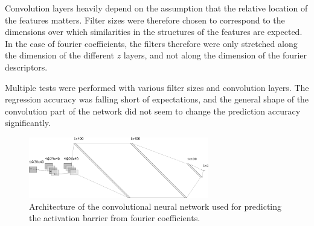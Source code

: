 Convolution layers heavily depend on the assumption that the relative location of the features matters.
Filter sizes were therefore chosen to correspond to the dimensions over which similarities in the structures of the features are expected.
In the case of fourier coefficients, the filters therefore were only stretched along the dimension of the different $z$ layers, and not along the dimension of the fourier descriptors.

Multiple tests were performed with various filter sizes and convolution layers.
The regression accuracy was falling short of expectations, and the general shape of the convolution part of the network did not seem to change the prediction accuracy significantly.

\begin{figure} [h]
    \centering
    \includegraphics[width=0.7\textwidth]{figures/regression/fourier/cnn/fourier_conv_layout.png} 
    \caption[Layout of LEFD CNN]{
        Architecture of the convolutional neural network used for predicting the activation barrier from fourier coefficients.
    }
    \label{fig:cnn-architecture}
\end{figure}


